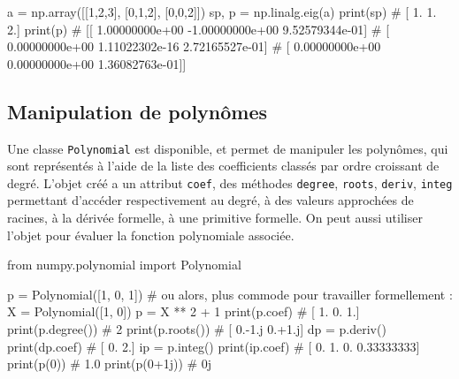 \documentclass[10pt,fleqn]{article} %
\begin{document}
\begin{multicols}{2}
\begin{python}
a = np.array([[1,2,3],
              [0,1,2],
              [0,0,2]])
sp, p = np.linalg.eig(a)
print(sp)
# [ 1.  1.  2.]
print(p)
# [[ 1.00000000e+00 -1.00000000e+00   9.52579344e-01]
#  [ 0.00000000e+00   1.11022302e-16   2.72165527e-01]
#  [ 0.00000000e+00   0.00000000e+00   1.36082763e-01]]  
\end{python}
\end{multicols}
%
%
%

\subsection{Manipulation de polynômes}

Une classe \texttt{Polynomial} est disponible, et permet de manipuler
les polynômes, qui sont représentés à l'aide de la liste des
coefficients classés par ordre croissant de degré. L'objet créé a un
attribut \texttt{coef}, des méthodes \texttt{degree}, \texttt{roots},
\texttt{deriv}, \texttt{integ} permettant d'accéder respectivement au degré, à des
valeurs approchées de racines, à la dérivée formelle, à une primitive
formelle. On peut aussi utiliser l'objet pour évaluer la fonction
polynomiale associée.

\begin{multicols}{2}
\begin{python}
from numpy.polynomial import Polynomial

p = Polynomial([1, 0, 1])
# ou alors, plus commode pour travailler formellement : 
X = Polynomial([1, 0])
p = X ** 2 + 1 
print(p.coef)
# [ 1.  0.  1.]
print(p.degree())
# 2
print(p.roots())
# [ 0.-1.j  0.+1.j]
dp = p.deriv()
print(dp.coef)
# [ 0.  2.]
ip = p.integ()
print(ip.coef)
# [ 0.          1.          0.          0.33333333]  
print(p(0))
# 1.0
print(p(0+1j))
# 0j
\end{python}
\end{multicols}
\begin{thebibliography}{2}

\end{thebibliography}
\end{document}
